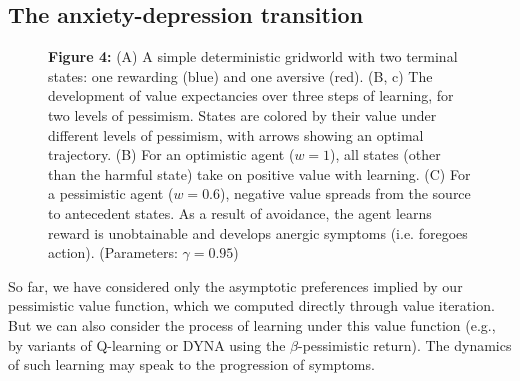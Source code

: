 \documentclass[11pt]{article} %
\begin{document}
\subsection{The anxiety-depression transition}

\begin{figure}[!b]
  \centerline{%
  }
  \par \textbf{Figure 4:} (A) A simple deterministic gridworld with two terminal states: one rewarding (blue) and one aversive (red). (B, c) The development of value expectancies over three steps of learning, for two levels of pessimism.
  States are colored by their value under different levels of pessimism, with arrows showing an optimal trajectory. (B) For an optimistic agent ($w=1$), all states (other than the harmful state) take on positive value with learning. (C) For a pessimistic agent ($w=0.6$), negative value spreads from the source to antecedent states. As a result of avoidance, the agent learns reward is unobtainable and develops anergic symptoms (i.e. foregoes action). (Parameters: $\gamma = 0.95$)
\end{figure}

So far, we have considered only the asymptotic preferences implied by our pessimistic value function, which we computed directly through value iteration. But we can also consider the process of learning under this value function (e.g., by variants of Q-learning\citep{SuttonBarto2018} or DYNA\citep{sutton1991, russek_predictive_2017} using the $\beta$-pessimistic return). The dynamics of such learning may speak to the progression of symptoms.
\end{document}
